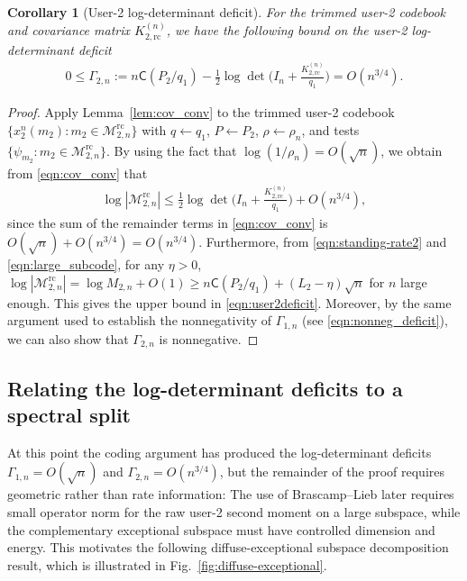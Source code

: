 \documentclass[11pt,onecolumn]{IEEEtran}
\newcommand{\calM}{\mathcal{M}}
\newcommand{\rvC}{\mathsf{C}}
\newtheorem{corollary}[theorem]{Corollary}
\newcommand{\rc}{\mathrm{rc}}
\begin{document}
\begin{corollary}[User-2 log-determinant deficit] For the trimmed user-2 codebook and covariance matrix $K_{2,\rc}^{(n)}$, we have  the following bound on the user-2 log-determinant deficit
\begin{align}
0\le\Gamma_{2,n}:=n\rvC(P_2/q_1)-\frac{1}{2}\log\det\bigg( I_n+ \frac{K_{2,\rc}^{(n)}}{q_1}\bigg) = O(n^{3/4}). \label{eqn:user2deficit}
\end{align} 
\end{corollary}
\begin{proof}
    Apply Lemma~\ref{lem:cov_conv} to the trimmed user-2 codebook $\{x_2^n(m_2) : m_2 \in\calM_{2,n}^\rc\}$ with $q\leftarrow q_1$, $P\leftarrow P_2$, $\rho\leftarrow\rho_n$, and tests $\{\psi_{m_2}: m_2 \in\calM_{2,n}^\rc\}$. By using the fact that $\log(1/\rho_n)=O(\sqrt{n})$, we obtain from \eqref{eqn:cov_conv} that 
\begin{align}
    \log | \calM_{2,n}^\rc|\le \frac{1}{2}\log \det\bigg( I_n+ \frac{K_{2,\rc}^{(n)}}{q_1}\bigg) +O(n^{3/4}),
\end{align}
since the sum of the remainder terms in \eqref{eqn:cov_conv} is $O(\sqrt{n})+O(n^{3/4})=O(n^{3/4})$. Furthermore, from \eqref{eqn:standing-rate2} and \eqref{eqn:large_subcode},  for any $\eta>0$, $\log | \calM_{2,n}^\rc|=\log M_{2,n}+O(1) \ge n \rvC(P_2/q_1)+(L_2-\eta)\sqrt{n}$ for $n$ large enough. This gives the upper bound in \eqref{eqn:user2deficit}. Moreover, by the same argument used to establish the nonnegativity of $\Gamma_{1,n}$ (see \eqref{eqn:nonneg_deficit}), we can also show that $\Gamma_{2,n}$ is nonnegative. 
\end{proof}

\subsection{Relating the log-determinant deficits to  a spectral split} \label{sec:split}
At this point the coding argument has produced the log-determinant deficits $\Gamma_{1,n} = O(\sqrt{n}) $ and $\Gamma_{2,n} = O(n^{3/4})$, but the remainder of the proof requires geometric rather than rate information:
The use of Brascamp--Lieb later requires small operator norm for the raw user-2 second moment on a large subspace, while the complementary exceptional subspace must have controlled dimension and energy. This motivates the following diffuse-exceptional subspace decomposition result, which is illustrated  in Fig.~\ref{fig:diffuse-exceptional}.
\end{document}
